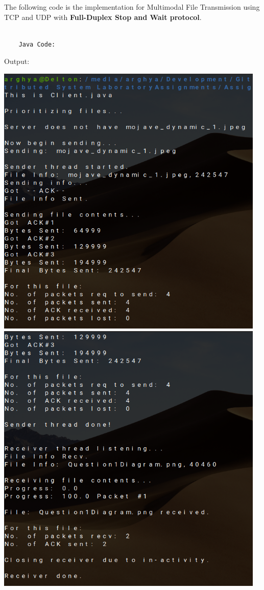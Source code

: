 \documentclass{article}
\begin{document}
The following code is the implementation for Multimodal File Transmission using TCP and UDP with
\textbf{Full-Duplex Stop and Wait protocol}.
\begin{lstlisting}

	Java Code:

\end{lstlisting}

\pagebreak

\pagebreak

\pagebreak

\pagebreak

\pagebreak

Output:


\includegraphics[width=365pt]{Output1}
\includegraphics[width=365pt]{Output2}
\end{document}
